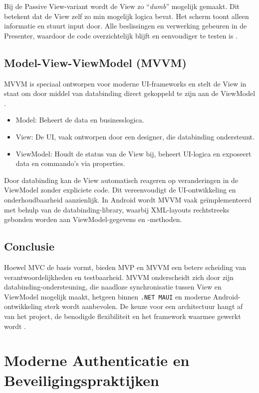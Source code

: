 Bij de Passive View-variant wordt de View zo “\textit{dumb}” mogelijk gemaakt. Dit betekent dat de View zelf zo min mogelijk logica bevat. Het scherm toont alleen informatie en stuurt input door. Alle beslissingen en verwerking gebeuren in de Presenter, waardoor de code overzichtelijk blijft en eenvoudiger te testen is \textcite{Lou2016}.\\


\subsection{Model-View-ViewModel (MVVM)}
MVVM is speciaal ontworpen voor moderne UI-frameworks en stelt de View in staat om door middel van databinding direct gekoppeld te zijn aan de ViewModel \autocite{Lou2016}.  
\begin{itemize}
	\item Model: Beheert de data en businesslogica.  
	\item View: De UI, vaak ontworpen door een designer, die databinding ondersteunt.  
	\item ViewModel: Houdt de status van de View bij, beheert UI-logica en exposeert data en commando’s via properties.  
\end{itemize}

Door databinding kan de View automatisch reageren op veranderingen in de ViewModel zonder expliciete code. Dit vereenvoudigt de UI-ontwikkeling en onderhoudbaarheid aanzienlijk. In Android wordt MVVM vaak geïmplementeerd met behulp van de databinding-library, waarbij XML-layouts rechtstreeks gebonden worden aan ViewModel-gegevens en -methoden.

\subsection{Conclusie}
Hoewel MVC de basis vormt, bieden MVP en MVVM een betere scheiding van verantwoordelijkheden en testbaarheid. MVVM onderscheidt zich door zijn databinding-ondersteuning, die naadloze synchronisatie tussen View en ViewModel mogelijk maakt, hetgeen binnen \texttt{.NET MAUI} en moderne Android-ontwikkeling sterk wordt aanbevolen. De keuze voor een architectuur hangt af van het project, de benodigde flexibiliteit en het framework waarmee gewerkt wordt \autocite{Lou2016}.


\section{Moderne Authenticatie en Beveiligingspraktijken}

